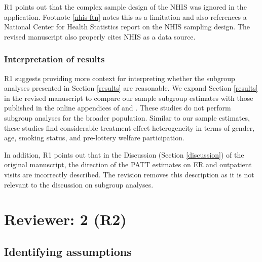 \documentclass[hidelinks,12pt,letterpaper]{article}
\begin{document}
R1 points out that the complex sample design of the NHIS was ignored in the application. Footnote \ref{nhis-ftn} notes this as a limitation and also references a National Center for Health Statistics report on the NHIS sampling design. The revised manuscript also properly cites NHIS as a data source. 

\subsubsection{Interpretation of results}

R1 suggests providing more context for interpreting whether the subgroup analyses presented in Section \ref{results} are reasonable. We expand Section \ref{results} in the revised manuscript to compare our sample subgroup estimates with those published in the online appendices of \citep{Taubman} and \citet{NBERw22363}. These studies do not perform subgroup analyses for the broader population. Similar to our sample estimates, these studies find considerable treatment effect heterogeneity in terms of gender, age, smoking status, and pre-lottery welfare participation. 


In addition, R1 points out that in the Discussion (Section \ref{discussion}) of the original manuscript, the direction of the PATT estimates on ER and outpatient visits are incorrectly described. The revision removes this description as it is not relevant to the discussion on subgroup analyses. 

\section{Reviewer: 2 (R2)}

\subsection{Identifying assumptions}
\end{document}
